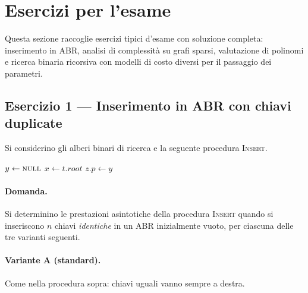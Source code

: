 \section{Esercizi per l'esame}
\label{sec:esercizi-esame}

\begin{softnote}
	Questa sezione raccoglie esercizi tipici d'esame con soluzione completa:
	inserimento in ABR, analisi di complessità su grafi sparsi, valutazione di polinomi
	e ricerca binaria ricorsiva con modelli di costo diversi per il passaggio dei parametri.
\end{softnote}

\subsection{Esercizio 1 --- Inserimento in ABR con chiavi duplicate}
\label{sub:es1-abr-insert}

Si considerino gli alberi binari di ricerca e la seguente procedura \textsc{Insert}.

\begin{algorithm}[H]
	\caption{\textsc{Insert}$(t,\, z)$ --- versione standard (riferimento)}
	$y \leftarrow \textsc{null}$\;
	$x \leftarrow t.\mathit{root}$\;
	$z.p \leftarrow y$\;
\end{algorithm}

\paragraph{Domanda.}
Si determinino le prestazioni asintotiche della procedura \textsc{Insert} quando si
inseriscono $n$ chiavi \emph{identiche} in un ABR inizialmente vuoto, per ciascuna delle
tre varianti seguenti.

\paragraph{Variante A (standard).}
Come nella procedura sopra: chiavi uguali vanno sempre a destra.

